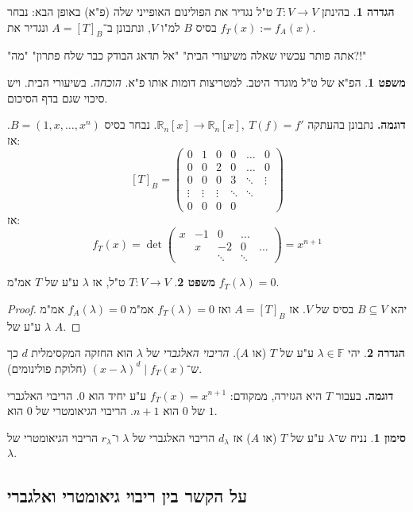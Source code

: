 \documentclass[a4paper]{article}
\newcommand\R     {\mathbb{R}}
\newcommand\F         {\mathbb{F}}
\newcommand\co        {\colon}
\newcommand\pms[1]    {\begin{pmatrix}
		#1
\end{pmatrix}}
\renewcommand\lg      {\lambda}
\theoremstyle{definition}
\newtheorem{Theorem}{משפט}
\newtheorem{definition}{הגדרה}
\newtheorem{Notion}{סימון}
\newcommand\theo  [1] {\begin{Theorem}#1\end{Theorem}}
\newcommand\defi  [1] {\begin{definition}#1\end{definition}}
\newcommand\noti  [1] {\begin{Notion}#1\end{Notion}}
\begin{document}
	\defi{בהינתן $T \co V \to V$ ט"ל נגדיר את הפולינום האופייני שלה (פ"א) באופן הבא: נבחר בסיס $B$ למ"ו $V$, ונתבונן ב־$A = [T]_B$ ונגדיר את $f_T(x) := f_A(x)$. }
	
	"אתה פותר עכשיו שאלה משיעורי הבית" "אל תדאג הבודק כבר שלח פתרון" "מה?!"
	
	\theo{הפ"א של ט"ל מוגדר היטב. למטריצות דומות אותו פ"א. \textit{הוכחה. }בשיעורי הבית. ויש סיכוי שגם בדף הסיכום. }
	
	\textbf{דוגמה. }נתבונן בהעתקה $\R_n[x] \to \R_n[x], \ T(f) = f'$. נבחר בסיס $B = (1, x, \dots, x^{n})$. אז: 
	\[ [T]_B = \pms{0 & 1  & 0 & 0 & \dots & 0 \\ 0 & 0 & 2 & 0 & \dots & 0 \\ 0 & 0 & 0 & 3 & \ddots & \vdots \\ \vdots & \vdots & \vdots & \ddots & \ddots \\ 0 & 0 & 0 & 0 } \]
	אז: 
	\[ f_T(x) = \det\pms{x & -1 & 0 &\dots \\ & x & -2 & 0 &\dots \\ && \ddots &\ddots } = x^{n + 1} \]
	\theo{$T \co V \to V$ ט"ל, אז $\lg$ ע"ע של $T$ אמ"מ $f_T(\lg) = 0$. }
	\begin{proof}
		יהא $B \subseteq V$ בסיס של $V$. אז $A = [T]_B$ ואז $f_T(\lg) = 0$ אמ"מ $f_A(\lg) = 0$ אמ"מ $\lg$ ע"ע של $A$. 
	\end{proof}
	
	\defi{יהי $\lg \in \F$ ע"ע של $T$ (או $A$). \textit{הריבוי האלגברי} של $\lg$ הוא החזקה המקסימלית $d$ כך ש־$(x - \lg)^{d} \mid f_T(x)$ (חלוקת פולינומים). }
	
	\textbf{דוגמה. }בעבור $T$ היא הגזירה, ממקודם: $f_T(x) = x^{n + 1}$ ע"ע יחיד הוא $0$. הריבוי האלגברי של $0$ הוא $n + 1$. הריבוי הגיאומטרי של $0$ הוא $1$. 
	
	\noti{נניח ש־$\lg$ ע"ע של $T$ (או $A$) אז $d_\lg$ הריבוי האלגברי של $\lg$ ו־$r_\lg$ הריבוי הגיאומטרי של $\lg$. }
	\subsection{על הקשר בין ריבוי גיאומטרי ואלגברי}
	
\end{document}
